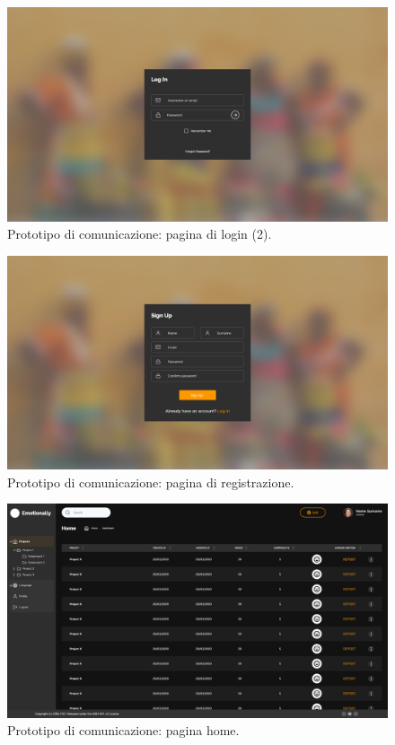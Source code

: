 \begin{figure}[H]
	\centering
	\caption{Prototipo di comunicazione: pagina di login (2).}
	\label{fig:prototipo-comunicazione:login-2}
	\includegraphics[width=\textwidth]{images/prototipo-comunicazione/login-2.png}
\end{figure}

\begin{figure}[H]
	\centering
	\caption{Prototipo di comunicazione: pagina di registrazione.}
	\label{fig:prototipo-comunicazione:registrazione}
	\includegraphics[width=\textwidth]{images/prototipo-comunicazione/registrazione.png}
\end{figure}

\begin{figure}[H]
	\centering
	\caption{Prototipo di comunicazione: pagina home.}
	\label{fig:prototipo-comunicazione:home}
	\includegraphics[width=\textwidth]{images/prototipo-comunicazione/home-no-scroll.png}
\end{figure}

